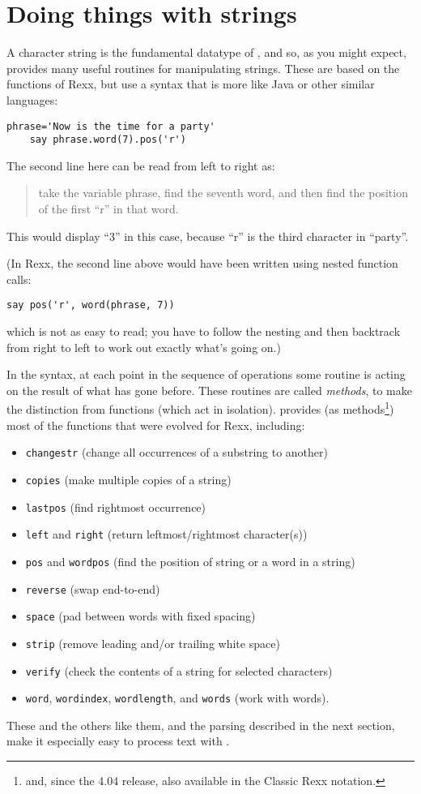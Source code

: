 \section{Doing things with strings}
A character string is the fundamental datatype of \nr{}, and so, as
you might expect, \nr{} provides many useful routines for
manipulating strings. These are based on the functions of Rexx, but
use a syntax that is more like Java or other similar languages:
\begin{lstlisting}[label=strings,caption=Strings]
    phrase='Now is the time for a party'
    say phrase.word(7).pos('r')
\end{lstlisting}
The second line here can be read from left to right as:
\begin{quote}take the variable phrase, find the seventh word, and then find the position of
the first “r” in that word.\end{quote}
This would display “3” in this case, because “r” is the third character in “party”.

(In Rexx, the second line above would have been written using nested
function calls:
\begin{lstlisting}[label=nested,caption=Rexx: Nested]
    say pos('r', word(phrase, 7))
\end{lstlisting}
which is not as easy to read; you have to follow the nesting and then
backtrack from right to left to work out exactly what’s going on.)

In the \nr{} syntax, at each point in the sequence of operations
some routine is acting on the result of what has gone before. These
routines are called \emph{methods}, to make the distinction from functions
(which act in isolation). \nr{} provides (as methods\footnote{and,
since the 4.04 release, also available in the Classic Rexx notation.}) most of the
functions that were evolved for Rexx, including:
\begin{itemize}
\item \texttt{changestr} (change all occurrences of a substring to another)
\item \texttt{copies} (make multiple copies of a string)
\item \texttt{lastpos} (find rightmost occurrence)
\item \texttt{left} and \texttt{right} (return leftmost/rightmost character(s))
\item \texttt{pos} and \texttt{wordpos} (find the position of string or a word in a string)
\item \texttt{reverse} (swap end-to-end)
\item \texttt{space} (pad between words with fixed spacing)
\item \texttt{strip} (remove leading and/or trailing white space)
\item \texttt{verify} (check the contents of a string for selected characters)
\item \texttt{word}, \texttt{wordindex}, \texttt{wordlength}, and \texttt{words} (work with words).
\end{itemize}
These and the others like them, and the parsing described in the next section, make it especially easy to process text with \nr{}.
